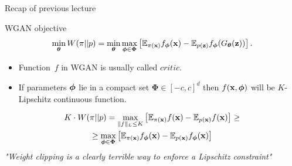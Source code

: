

\begin{frame}
\titlepage
\end{frame}
\begin{frame}{Recap of previous lecture}
	\begin{block}{WGAN objective}
		\vspace{-0.5cm}
		\[
		\min_{\boldsymbol{\theta}} W(\pi || p) = \min_{\boldsymbol{\theta}} \max_{\boldsymbol{\phi} \in \boldsymbol{\Phi}} \left[ \mathbb{E}_{\pi(\mathbf{x})} f_{\boldsymbol{\phi}}(\mathbf{x})  - \mathbb{E}_{p(\mathbf{z})} f_{\boldsymbol{\phi}}(G_{\boldsymbol{\theta}}(\mathbf{z}))\right].
		\]
		\vspace{-0.5cm}
	\end{block}
	\begin{itemize}
		\item Function~$f$ in WGAN is usually called $\textit{critic}$.
		\item If parameters $\boldsymbol{\phi}$ lie in a compact set $\boldsymbol{\Phi} \in [-c, c]^d$ then $f(\mathbf{x}, \boldsymbol{\phi})$ will be $K$-Lipschitz continuous function. 
	\end{itemize}
	\begin{multline*}
		K \cdot W(\pi || p) = \max_{\| f \|_L \leq K} \left[ \mathbb{E}_{\pi(\mathbf{x})} f(\mathbf{x})  - \mathbb{E}_{p(\mathbf{x})} f(\mathbf{x})\right] \geq \\  \geq \max_{\boldsymbol{\phi} \in \boldsymbol{\Phi}} \left[ \mathbb{E}_{\pi(\mathbf{x})} f_{\boldsymbol{\phi}}(\mathbf{x})  - \mathbb{E}_{p(\mathbf{x})} f_{\boldsymbol{\phi}}(\mathbf{x})\right]
	\end{multline*}
	\textit{"Weight clipping is a clearly terrible way to enforce a Lipschitz constraint"}
\end{frame}
